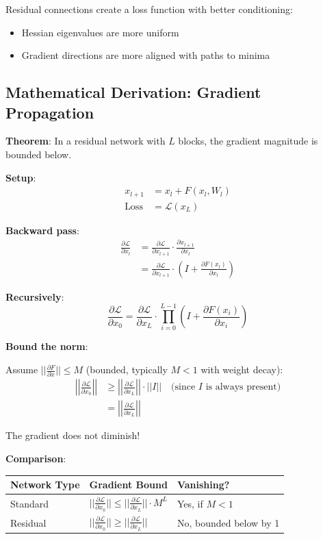 Residual connections create a loss function with better conditioning:
\begin{itemize}
\item Hessian eigenvalues are more uniform
\item Gradient directions are more aligned with paths to minima
\end{itemize}

\subsection{Mathematical Derivation: Gradient Propagation}

\textbf{Theorem}: In a residual network with $L$ blocks, the gradient magnitude is bounded below.

\textbf{Setup}:
\begin{align*}
x_{l+1} &= x_l + F(x_l, W_l) \\
\text{Loss} &= \mathcal{L}(x_L)
\end{align*}

\textbf{Backward pass}:
\begin{align*}
\frac{\partial \mathcal{L}}{\partial x_l} &= \frac{\partial \mathcal{L}}{\partial x_{l+1}} \cdot \frac{\partial x_{l+1}}{\partial x_l} \\
&= \frac{\partial \mathcal{L}}{\partial x_{l+1}} \cdot \left(I + \frac{\partial F(x_l)}{\partial x_l}\right)
\end{align*}

\textbf{Recursively}:
\[
\frac{\partial \mathcal{L}}{\partial x_0} = \frac{\partial \mathcal{L}}{\partial x_L} \cdot \prod_{i=0}^{L-1} \left(I + \frac{\partial F(x_i)}{\partial x_i}\right)
\]

\textbf{Bound the norm}:

Assume $||\frac{\partial F}{\partial x}|| \leq M$ (bounded, typically $M < 1$ with weight decay):
\begin{align*}
\left|\left|\frac{\partial \mathcal{L}}{\partial x_0}\right|\right| &\geq \left|\left|\frac{\partial \mathcal{L}}{\partial x_L}\right|\right| \cdot ||I|| \quad \text{(since } I \text{ is always present)} \\
&= \left|\left|\frac{\partial \mathcal{L}}{\partial x_L}\right|\right|
\end{align*}

The gradient does not diminish!

\textbf{Comparison}:

\begin{table}[h]
\centering
\begin{tabular}{lll}
\toprule
\textbf{Network Type} & \textbf{Gradient Bound} & \textbf{Vanishing?} \\
\midrule
Standard & $||\frac{\partial \mathcal{L}}{\partial x_0}|| \leq ||\frac{\partial \mathcal{L}}{\partial x_L}|| \cdot M^L$ & Yes, if $M < 1$ \\
Residual & $||\frac{\partial \mathcal{L}}{\partial x_0}|| \geq ||\frac{\partial \mathcal{L}}{\partial x_L}||$ & No, bounded below by 1 \\
\bottomrule
\end{tabular}
\end{table}

